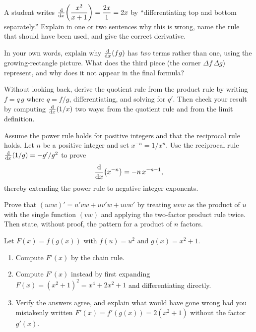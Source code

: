 \begin{exercise}
A student writes $\frac{\mathrm{d}}{\mathrm{d} x}\!\left(\dfrac{x^2}{x+1}\right) = \dfrac{2x}{1} = 2x$ by ``differentiating top and
bottom separately.'' Explain in one or two sentences why this is wrong, name the rule that
should have been used, and give the correct derivative.
\end{exercise}

\begin{exercise}
In your own words, explain why $\frac{\mathrm{d}}{\mathrm{d} x}\!\left(fg\right)$ has \emph{two} terms rather than one, using the
growing-rectangle picture. What does the third piece (the corner $\Delta f\,\Delta g$)
represent, and why does it not appear in the final formula?
\end{exercise}

\begin{exercise}
Without looking back, derive the quotient rule from the product rule by writing
$f = q\,g$ where $q = f/g$, differentiating, and solving for $q'$. Then check your result
by computing $\frac{\mathrm{d}}{\mathrm{d} x}\!\left(1/x\right)$ two ways: from the quotient rule and from the limit definition.
\end{exercise}

\begin{exercise}
Assume the power rule holds for positive integers and that the reciprocal rule holds. Let
$n$ be a positive integer and set $x^{-n} = 1/x^{n}$. Use the reciprocal rule
$\frac{\mathrm{d}}{\mathrm{d} x}\!\left(1/g\right) = -g'/g^2$ to prove
\[
  \frac{\mathrm{d}}{\mathrm{d} x}\!\left(x^{-n}\right) = -n\,x^{-n-1},
\]
thereby extending the power rule to negative integer exponents.
\end{exercise}

\begin{exercise}
Prove that $(uvw)' = u'vw + uv'w + uvw'$ by treating $uvw$ as the product of $u$ with the
single function $(vw)$ and applying the two-factor product rule twice. Then state, without
proof, the pattern for a product of $n$ factors.
\end{exercise}

\begin{exercise}
Let $F(x) = f(g(x))$ with $f(u) = u^2$ and $g(x) = x^2 + 1$.
\begin{enumerate}
  \item Compute $F'(x)$ by the chain rule.
  \item Compute $F'(x)$ instead by first expanding $F(x) = (x^2+1)^2 = x^4 + 2x^2 + 1$ and
        differentiating directly.
  \item Verify the answers agree, and explain what would have gone wrong had you mistakenly
        written $F'(x) = f'(g(x)) = 2(x^2+1)$ without the factor $g'(x)$.
\end{enumerate}
\end{exercise}

